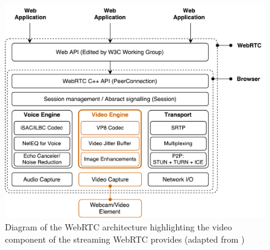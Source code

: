      \begin{figure}[h!]
        \centering
        \includegraphics[width=0.8\linewidth]{figures/softDesign-webRTCArch}
        \caption[Diagram of the WebRTC architecture highlighting the video component of the streaming WebRTC provides]{Diagram of the WebRTC architecture highlighting the video component of the streaming WebRTC provides (adapted from \cite{fig:softDesign-webRTCArch_cite})}
        \label{fig:softDesign-webRTCArch}
      \end{figure}
      
